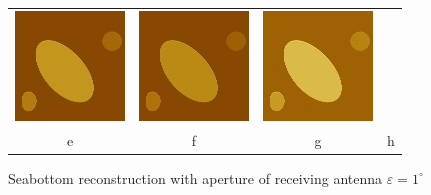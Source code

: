 \documentclass{procDDs}
\begin{document}
\begin{figure}[h!]
\begin{tabular}{cccc}
		\includegraphics[width=0.2\linewidth]{k-img-5-7.jpg}&
		\includegraphics[width=0.2\linewidth]{k-img-5-8.jpg}&
		\includegraphics[width=0.2\linewidth]{k-img-5-9.jpg}\\
		e & f & g & h		
	\end{tabular}
	\caption{Seabottom reconstruction with aperture of receiving antenna $\varepsilon=1^\circ$}
	\label{ris:desc1}
\end{figure}
\end{document}
